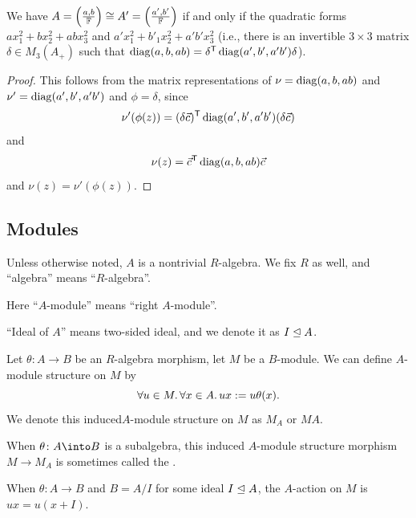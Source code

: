 \begin{corollary}\label{cor:1.13}
We have $A=\left(\frac{a,b}{\mathbb{F}}\right)\cong A'=\left(\frac{a',b'}{\mathbb{F}}\right)$
if and only if the quadratic forms $ax_{1}^{2}+bx_{2}^{2}+abx_{3}^{2}$
and $a'x_{1}^{2}+b'_{1}x_{2}^{2}+a'b'x_{3}^{2}$ (i.e., there is an
invertible $3\times3$ matrix $\delta\in M_{3}(A_{+})$ such that $\operatorname{diag}(a,b,ab)=\delta^{\mathsf{T}}\operatorname{diag}(a',b',a'b')\delta$).
\end{corollary}

\begin{proof}
This follows from the matrix representations of $\nu=\operatorname{diag}(a,b,ab)$
and $\nu'=\operatorname{diag}(a',b',a'b')$ and $\phi=\delta$, since
\begin{equation}
\nu'(\phi(z))=(\delta\vec{c})^{\mathsf{T}}\operatorname{diag}(a',b',a'b')(\delta\vec{c})
\end{equation}
and
\begin{equation}
\nu(z)=\vec{c}^{\mathsf{T}}\operatorname{diag}(a,b,ab)\vec{c}
\end{equation}
and $\nu(z)=\nu'(\phi(z))$.
\end{proof}

\subsection{Modules}

\begin{convention}
Unless otherwise noted, $A$ is a nontrivial $R$-algebra. We fix $R$ as
well, and ``algebra'' means ``$R$-algebra''.

Here ``$A$-module'' means ``right $A$-module''.

``Ideal of $A$'' means two-sided ideal, and we denote it as $I\mathrel{\trianglelefteq} A$.
\end{convention}

\begin{node}
Let $\theta\colon A\to B$ be an $R$-algebra morphism, let $M$ be a
$B$-module. We can define $A$-module structure on $M$ by
\begin{equation}
\forall u\in M\ldotp\forall x\in A\ldotp ux := u\theta(x).
\end{equation}
We denote this induced$A$-module structure on $M$ as $M_{A}$ or $MA$.

When $\theta\colon A\into B$ is a subalgebra, this induced $A$-module
structure morphism $M\to M_{A}$ is sometimes called the
.

When $\theta\colon A\to B$ and $B=A/I$ for some ideal $I\mathrel{\trianglelefteq} A$, the
$A$-action on $M$ is $ux=u(x+I)$.
\end{node}

